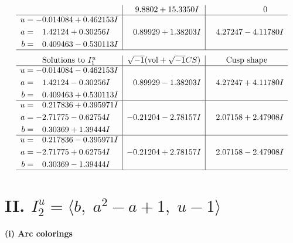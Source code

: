 \documentclass[1p]{elsarticle_modified}
\theoremstyle{definition}
\newcommand{\I}{\sqrt{-1}}
\begin{document}
$$\begin{array}{c|c|c}
 & \phantom{-}9.8802 + 15.3350 I & \phantom{-0.000000 } 0 \\ \hline\begin{aligned}
u &= -0.014084 + 0.462153 I \\
a &= \phantom{-}1.42124 + 0.30256 I \\
b &= \phantom{-}0.409463 - 0.530113 I\end{aligned}
 & \phantom{-}0.89929 + 1.38203 I & \phantom{-}4.27247 - 4.11780 I\\
 \hline 
 \end{array}$$\newpage$$\begin{array}{c|c|c}  
\text{Solutions to }I^u_{1}& \I (\text{vol} + \sqrt{-1}CS) & \text{Cusp shape}\\
 \hline 
\begin{aligned}
u &= -0.014084 - 0.462153 I \\
a &= \phantom{-}1.42124 - 0.30256 I \\
b &= \phantom{-}0.409463 + 0.530113 I\end{aligned}
 & \phantom{-}0.89929 - 1.38203 I & \phantom{-}4.27247 + 4.11780 I \\ \hline\begin{aligned}
u &= \phantom{-}0.217836 + 0.395971 I \\
a &= -2.71775 - 0.62754 I \\
b &= \phantom{-}0.30369 + 1.39444 I\end{aligned}
 & -0.21204 - 2.78157 I & \phantom{-}2.07158 + 2.47908 I \\ \hline\begin{aligned}
u &= \phantom{-}0.217836 - 0.395971 I \\
a &= -2.71775 + 0.62754 I \\
b &= \phantom{-}0.30369 - 1.39444 I\end{aligned}
 & -0.21204 + 2.78157 I & \phantom{-}2.07158 - 2.47908 I\\
 \hline 
 \end{array}$$\newpage\newpage\renewcommand{\arraystretch}{1}
\centering \section*{II. $I^u_{2}= \langle b,\;a^2- a+1,\;u-1 \rangle$}
\flushleft \textbf{(i) Arc colorings}\\
\end{document}
